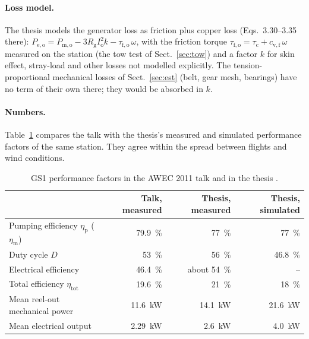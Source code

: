 \documentclass[11pt,a4paper]{article}
\begin{document}
\paragraph{Loss model.} The thesis models the generator loss as friction plus
copper loss (Eqs.~3.30--3.35 there):
$P_\mathrm{e,o} = P_\mathrm{m,o} - 3 R_\mathrm{g} I_\mathrm{o}^2 k - \tau_\mathrm{f,o}\,\omega$,
with the friction torque $\tau_\mathrm{f,o} = \tau_\mathrm{c} + c_\mathrm{v,f}\,\omega$
measured on the station (the tow test of Sect.~\ref{sec:tow}) and a factor $k$
for skin effect, stray-load and other losses not modelled explicitly. The
tension-proportional mechanical losses of Sect.~\ref{sec:est} (belt, gear
mesh, bearings) have no term of their own there; they would be absorbed in
$k$.

\paragraph{Numbers.} Table~\ref{tab:thesis} compares the talk with the
thesis's measured and simulated performance factors of the same station. They
agree within the spread between flights and wind conditions.

\begin{table}[H]
\centering\small
\caption{GS1 performance factors in the AWEC 2011 talk \cite{fechner2011} and
in the thesis \cite[Table~3.3 and Sect.~3.3.2]{fechner2016}.}
\label{tab:thesis}
\begin{tabular}{lrrr}
\toprule
 & Talk, measured & Thesis, measured & Thesis, simulated \\
\midrule
Pumping efficiency $\eta_\mathrm{p}$ ($\eta_\mathrm{m}$) & \SI{79.9}{\percent} & \SI{77}{\percent} & \SI{77}{\percent} \\
Duty cycle $D$ & \SI{53}{\percent} & \SI{56}{\percent} & \SI{46.8}{\percent} \\
Electrical efficiency & \SI{46.4}{\percent} & about \SI{54}{\percent} & -- \\
Total efficiency $\eta_\mathrm{tot}$ & \SI{19.6}{\percent} & \SI{21}{\percent} & \SI{18}{\percent} \\
Mean reel-out mechanical power & \SI{11.6}{kW} & \SI{14.1}{kW} & \SI{21.6}{kW} \\
Mean electrical output & \SI{2.29}{kW} & \SI{2.6}{kW} & \SI{4.0}{kW} \\
\bottomrule
\end{tabular}
\end{table}
\end{document}
